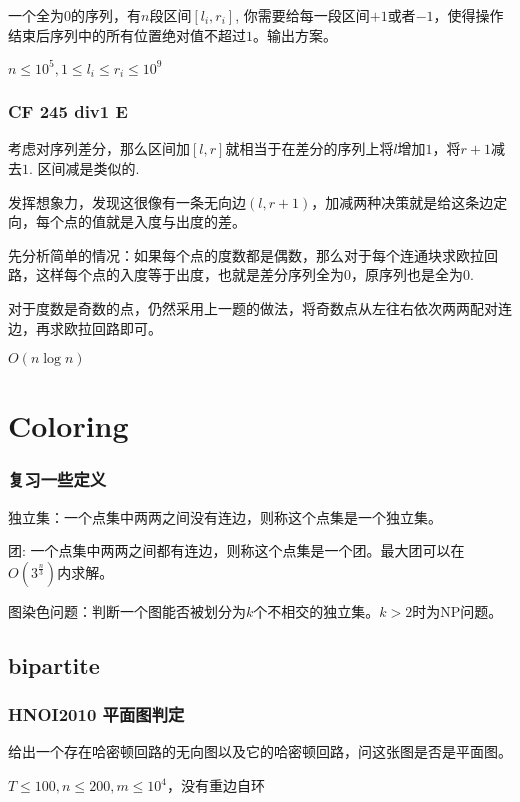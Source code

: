 \documentclass[10pt]{beamer}
\begin{document}
\begin{CJK}{UTF8}{gkai}
\begin{spacing}{1.1}
\begin{frame}
	一个全为0的序列，有$n$段区间$[l_i, r_i]$, 你需要给每一段区间$+1$或者$-1$，使得操作结束后序列中的所有位置绝对值不超过$1$。输出方案。

	$n \le 10^5, 1 \le l_i \le r_i \le 10^9$

\end{frame}

\begin{frame}
\frametitle{CF 245 div1 E}

	考虑对序列差分，那么区间加$[l, r]$就相当于在差分的序列上将$l$增加$1$，将$r + 1$减去$1$. 区间减是类似的. \pause

	发挥想象力，发现这很像有一条无向边$(l, r + 1)$，加减两种决策就是给这条边定向，每个点的值就是入度与出度的差。\pause

	先分析简单的情况：如果每个点的度数都是偶数，那么对于每个连通块求欧拉回路，这样每个点的入度等于出度，也就是差分序列全为$0$，原序列也是全为$0$.

	对于度数是奇数的点，仍然采用上一题的做法，将奇数点从左往右依次两两配对连边，再求欧拉回路即可。

	$O(n \log n)$

\end{frame}

\section{Coloring}

\begin{frame}
\frametitle{复习一些定义}

	独立集：一个点集中两两之间没有连边，则称这个点集是一个独立集。\pause

	团: 一个点集中两两之间都有连边，则称这个点集是一个团。最大团可以在$O(3^{\frac n3})$内求解。\pause

	图染色问题：判断一个图能否被划分为$k$个不相交的独立集。$k > 2$时为NP问题。

\end{frame}

\subsection{bipartite}
\begin{frame}
\frametitle{HNOI2010 平面图判定}

	给出一个存在哈密顿回路的无向图以及它的哈密顿回路，问这张图是否是平面图。

	$T \le 100, n \le 200, m \le 10^4$，没有重边自环

\end{frame}


\end{spacing}
\end{CJK}
\end{document}
